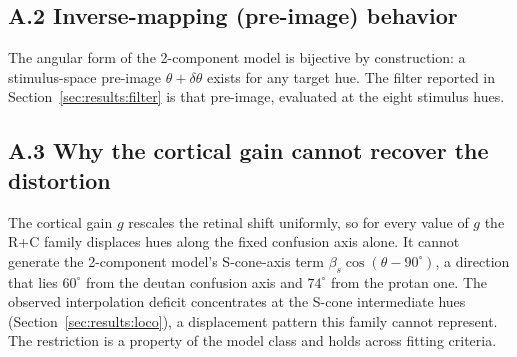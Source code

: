 \subsection*{A.2 Inverse-mapping (pre-image) behavior}

The angular form of the 2-component model is bijective by construction: a stimulus-space pre-image $\theta + \delta\theta$ exists for any target hue. The filter reported in Section~\ref{sec:results:filter} is that pre-image, evaluated at the eight stimulus hues.

\subsection*{A.3 Why the cortical gain cannot recover the distortion}

The cortical gain $g$ rescales the retinal shift uniformly, so for every value of $g$ the R+C family displaces hues along the fixed confusion axis alone. It cannot generate the 2-component model's S-cone-axis term $\beta_s \cos(\theta - 90^\circ)$, a direction that lies $60^\circ$ from the deutan confusion axis and $74^\circ$ from the protan one. The observed interpolation deficit concentrates at the S-cone intermediate hues (Section~\ref{sec:results:loco}), a displacement pattern this family cannot represent. The restriction is a property of the model class and holds across fitting criteria.
